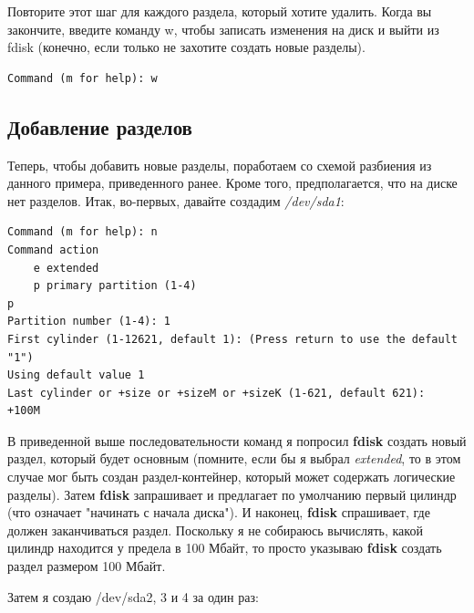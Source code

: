 \documentclass[10pt]{book}
\begin{document}
Повторите этот шаг для каждого раздела, который хотите удалить. Когда вы закончите, введите команду w, чтобы записать изменения на диск и выйти из fdisk (конечно, если только не захотите создать новые разделы).

\begin{tcolorbox} 
\begin{lstlisting}
Command (m for help): w 
\end{lstlisting}
\end{tcolorbox}

\subsection{Добавление разделов}

Теперь, чтобы добавить новые разделы, поработаем со схемой разбиения из данного примера, приведенного ранее. Кроме того, предполагается, что на диске нет разделов. Итак, во-первых, давайте создадим \textit{/dev/sda1}:

\begin{tcolorbox} 
\begin{lstlisting}
Command (m for help): n
Command action
    e extended
    p primary partition (1-4)
p
Partition number (1-4): 1
First cylinder (1-12621, default 1): (Press return to use the default "1")
Using default value 1
Last cylinder or +size or +sizeM or +sizeK (1-621, default 621):
+100M
\end{lstlisting}
\end{tcolorbox}

В приведенной выше последовательности команд я попросил \textbf{fdisk} создать новый раздел, который будет основным (помните, если бы я выбрал \textit{extended}, то в этом случае мог быть создан раздел-контейнер, который может содержать логические разделы). Затем \textbf{fdisk} запрашивает и предлагает по умолчанию первый цилиндр (что означает "начинать с начала диска"). И наконец, \textbf{fdisk} спрашивает, где должен заканчиваться раздел. Поскольку я не собираюсь вычислять, какой цилиндр находится у предела в 100 Мбайт, то просто указываю \textbf{fdisk} создать раздел размером 100 Мбайт.

Затем я создаю /dev/sda2, 3 и 4 за один раз:
\end{document}
